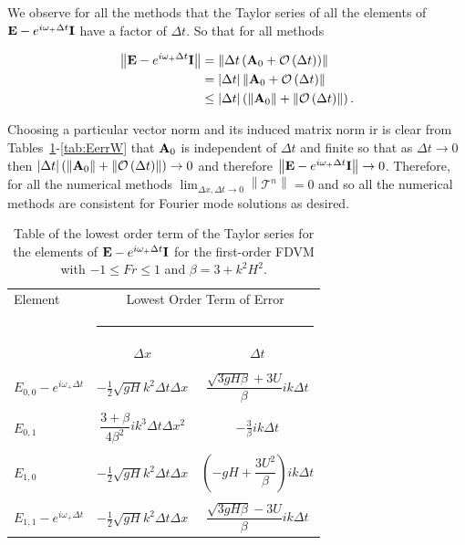 We observe for all the methods that the Taylor series of all the elements of $\mathbf{E} -  e^{i \omega_+ \Delta t}\mathbf{I}$ have a factor of $\Delta t$. So that for all methods 

\begin{align*}
\left \| \mathbf{E} -  e^{i \omega_+ \Delta t}\mathbf{I} \right \| &=  \left \| \Delta t \left(\mathbf{A}_0 +  \mathcal{O}\left(\Delta t\right)\right)\right \|  \nonumber\\ &= |\Delta t|  \left \| \mathbf{A}_0 +  \mathcal{O}\left(\Delta t\right)\right \|
 \nonumber\\ &\le  |\Delta t| \left(\left \| \mathbf{A}_0 \right \| + \left \| \mathcal{O}\left(\Delta t\right)\right \|\right).
\end{align*} 

Choosing a particular vector norm and its induced matrix norm ir is clear from Tables~\ref{tab:EerrFDVM1}-\ref{tab:EerrW} that $\mathbf{A}_0$ is independent of $\Delta t$ and finite so that as $\Delta t \rightarrow 0$ then $|\Delta t| \left(\left \| \mathbf{A}_0 \right \| + \left \| \mathcal{O}\left(\Delta t\right)\right \|\right)  \rightarrow 0$  and therefore  $\left \| \mathbf{E} -  e^{i \omega_+ \Delta t}\mathbf{I} \right \| \rightarrow 0$. Therefore, for all the numerical methods $ \lim_{\Delta x,\Delta t \rightarrow 0}\left \| \mathcal{T}^n \right \| = 0 $ and so all the numerical methods are consistent for Fourier mode solutions as desired. 

\begin{table}
	\begin{tabular}{l  c c}
	\hline
		Element & \multicolumn{2}{c}{Lowest Order Term of Error}\\
		&  \multicolumn{2}{l}{\rule{0.7\textwidth}{0.4pt}} \\
		& $\Delta x$&$\Delta t$\\
		\hline && \\
		$E_{0,0} -  e^{i \omega_+ \Delta t} $& $ - \frac{1}{2} \sqrt{gH} k^2 \Delta t\Delta x$ & $\dfrac{\sqrt{3gH \beta} + 3U}{\beta} ik \Delta t$ \\ & & \\
		$E_{0,1}$& $ \dfrac{3 + \beta}{4 \beta^2}i k^3\Delta  t\Delta x^2$ &  $ - \frac{3}{\beta} ik\Delta t$ \\ & & \\
		$E_{1,0}$& $ - \frac{1}{2} \sqrt{gH} k^2 \Delta t\Delta x$ &  $ \left(-gH + \dfrac{3U^2}{\beta}\right)ik \Delta t$ \\ & & \\
		$E_{1,1} -  e^{i \omega_+ \Delta t}$& $ - \frac{1}{2} \sqrt{gH} k^2 \Delta t\Delta x$ & $\dfrac{\sqrt{3gH \beta} - 3U}{\beta} ik \Delta t$ \\ 
		\hline
	\end{tabular}
	\caption{Table of the lowest order term of the Taylor series for the elements of $\mathbf{E} - e^{i \omega_+ \Delta t} \mathbf{I}$ for the first-order FDVM with $ -1 \le Fr \le 1$ and $\beta = 3 + k^2 H^2$.}
	\label{tab:EerrFDVM1} 
\end{table}

